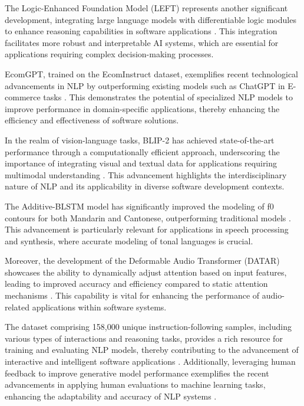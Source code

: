 The Logic-Enhanced Foundation Model (LEFT) represents another significant development, integrating large language models with differentiable logic modules to enhance reasoning capabilities in software applications \cite{hsu2023whatsleftconceptgrounding}. This integration facilitates more robust and interpretable AI systems, which are essential for applications requiring complex decision-making processes.



EcomGPT, trained on the EcomInstruct dataset, exemplifies recent technological advancements in NLP by outperforming existing models such as ChatGPT in E-commerce tasks \cite{li2023ecomgptinstructiontuninglargelanguage}. This demonstrates the potential of specialized NLP models to improve performance in domain-specific applications, thereby enhancing the efficiency and effectiveness of software solutions.



In the realm of vision-language tasks, BLIP-2 has achieved state-of-the-art performance through a computationally efficient approach, underscoring the importance of integrating visual and textual data for applications requiring multimodal understanding \cite{li2023blip}. This advancement highlights the interdisciplinary nature of NLP and its applicability in diverse software development contexts.



The Additive-BLSTM model has significantly improved the modeling of f0 contours for both Mandarin and Cantonese, outperforming traditional models \cite{yuan2018generatingmandarincantonesef0}. This advancement is particularly relevant for applications in speech processing and synthesis, where accurate modeling of tonal languages is crucial.



Moreover, the development of the Deformable Audio Transformer (DATAR) showcases the ability to dynamically adjust attention based on input features, leading to improved accuracy and efficiency compared to static attention mechanisms \cite{zhu2024deformableaudiotransformeraudio}. This capability is vital for enhancing the performance of audio-related applications within software systems.



The dataset comprising 158,000 unique instruction-following samples, including various types of interactions and reasoning tasks, provides a rich resource for training and evaluating NLP models, thereby contributing to the advancement of interactive and intelligent software applications \cite{liu2024visual}. Additionally, leveraging human feedback to improve generative model performance exemplifies the recent advancements in applying human evaluations to machine learning tasks, enhancing the adaptability and accuracy of NLP systems \cite{park2023domainadaptationbasedhuman}.



